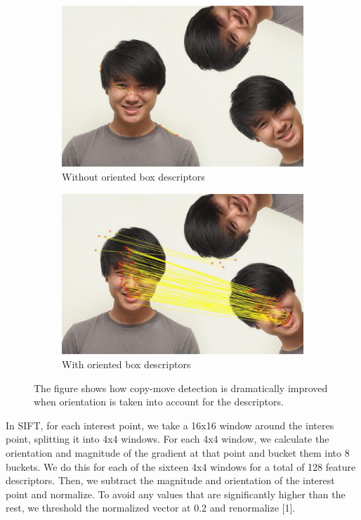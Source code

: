 \documentclass[12pt]{article}
\begin{document}
\begin{figure}
\centering
\begin{subfigure}{.5\textwidth}
  \centering
  \includegraphics[width=.8\linewidth]{./gfx/without_rotation.jpg}
  \caption{Without oriented box descriptors}
  \label{fig:sub1}
\end{subfigure}%
\begin{subfigure}{.5\textwidth}
  \centering
  \includegraphics[width=.8\linewidth]{./gfx/with_rotation.jpg}
  \caption{With oriented box descriptors}
  \label{fig:sub2}
\end{subfigure}
\caption{The figure shows how copy-move detection is dramatically improved when orientation is taken into account for the descriptors.}
\label{fig:test}
\end{figure}

In SIFT, for each interest point, we take a 16x16 window around the interes point, splitting it into 4x4 windows. For each 4x4 window, we calculate the orientation and magnitude of the gradient at that point and bucket them into 8 buckets. We do this for each of the sixteen 4x4 windows for a total of 128 feature descriptors. Then, we subtract the magnitude and orientation of the interest point and normalize. To avoid any values that are significantly higher than the rest, we threshold the normalized vector at 0.2 and renormalize [1].
\end{document}
